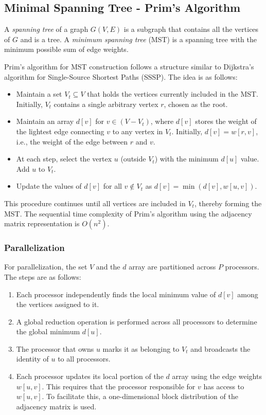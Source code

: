 \documentclass[12pt]{book}
\begin{document}
\subsection{Minimal Spanning Tree - Prim's Algorithm}
A \textit{spanning tree} of a graph $G(V,E)$ is a subgraph that contains all the vertices of $G$ and is a tree. A \textit{minimum spanning tree} (MST) is a spanning tree with the minimum possible sum of edge weights.  

Prim's algorithm for MST construction follows a structure similar to Dijkstra's algorithm for Single-Source Shortest Paths (SSSP). The idea is as follows:  

\begin{itemize}
    \item Maintain a set $V_t \subseteq V$ that holds the vertices currently included in the MST. Initially, $V_t$ contains a single arbitrary vertex $r$, chosen as the root.  
    \item Maintain an array $d[v]$ for $v \in (V - V_t)$, where $d[v]$ stores the weight of the lightest edge connecting $v$ to any vertex in $V_t$. Initially, $d[v] = w[r,v]$, i.e., the weight of the edge between $r$ and $v$.  
    \item At each step, select the vertex $u$ (outside $V_t$) with the minimum $d[u]$ value. Add $u$ to $V_t$.  
    \item Update the values of $d[v]$ for all $v \notin V_t$ as $d[v] = \min(d[v], w[u,v])$.  
\end{itemize}

This procedure continues until all vertices are included in $V_t$, thereby forming the MST. The sequential time complexity of Prim’s algorithm using the adjacency matrix representation is $O(n^2)$.

\subsubsection*{Parallelization}
For parallelization, the set $V$ and the $d$ array are partitioned across $P$ processors. The steps are as follows:

\begin{enumerate}
    \item Each processor independently finds the local minimum value of $d[v]$ among the vertices assigned to it.  
    \item A global reduction operation is performed across all processors to determine the global minimum $d[u]$.  
    \item The processor that owns $u$ marks it as belonging to $V_t$ and broadcasts the identity of $u$ to all processors.  
    \item Each processor updates its local portion of the $d$ array using the edge weights $w[u,v]$. This requires that the processor responsible for $v$ has access to $w[u,v]$. To facilitate this, a one-dimensional block distribution of the adjacency matrix is used.  
\end{enumerate}
\end{document}
